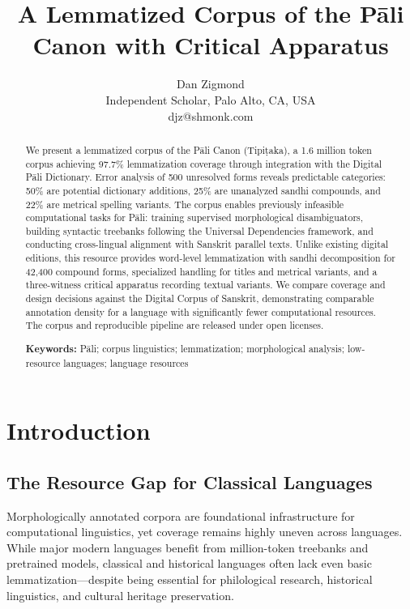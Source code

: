 \documentclass[11pt,twocolumn]{article}
\begin{document}
\title{A Lemmatized Corpus of the Pāli Canon with Critical Apparatus}

\author{Dan Zigmond\\Independent Scholar, Palo Alto, CA, USA\\djz@shmonk.com}

\date{}

\maketitle

\begin{abstract}
We present a lemmatized corpus of the Pāli Canon (Tipiṭaka), a 1.6 million token corpus achieving 97.7\% lemmatization coverage through integration with the Digital Pāli Dictionary. Error analysis of 500 unresolved forms reveals predictable categories: 50\% are potential dictionary additions, 25\% are unanalyzed sandhi compounds, and 22\% are metrical spelling variants. The corpus enables previously infeasible computational tasks for Pāli: training supervised morphological disambiguators, building syntactic treebanks following the Universal Dependencies framework, and conducting cross-lingual alignment with Sanskrit parallel texts. Unlike existing digital editions, this resource provides word-level lemmatization with sandhi decomposition for 42,400 compound forms, specialized handling for titles and metrical variants, and a three-witness critical apparatus recording textual variants. We compare coverage and design decisions against the Digital Corpus of Sanskrit, demonstrating comparable annotation density for a language with significantly fewer computational resources. The corpus and reproducible pipeline are released under open licenses.

\medskip
\noindent\textbf{Keywords:} Pāli; corpus linguistics; lemmatization; morphological analysis; low-resource languages; language resources
\end{abstract}

\section{Introduction}
\label{sec:intro}

\subsection{The Resource Gap for Classical Languages}

Morphologically annotated corpora are foundational infrastructure for computational linguistics, yet coverage remains highly uneven across languages. While major modern languages benefit from million-token treebanks and pretrained models, classical and historical languages often lack even basic lemmatization---despite being essential for philological research, historical linguistics, and cultural heritage preservation.
\end{document}

